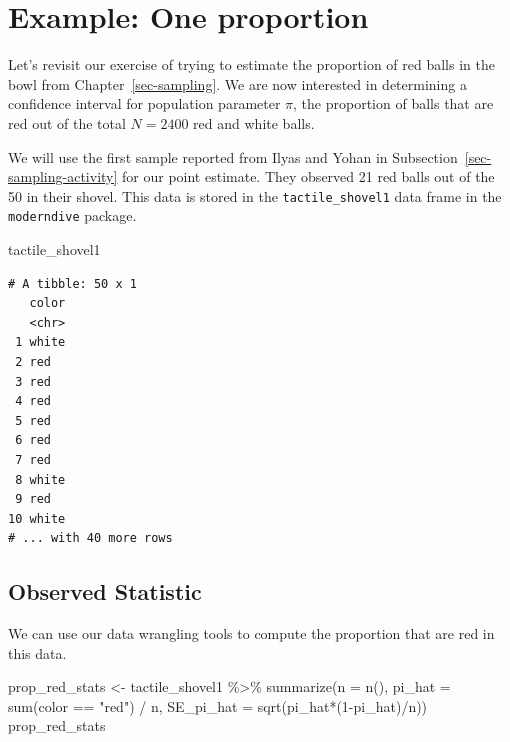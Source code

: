 \documentclass[
  letterpaper,
  DIV=11,
  numbers=noendperiod]{scrreprt}
\newenvironment{Shaded}{\begin{snugshade}}{\end{snugshade}}
\newcommand{\AttributeTok}[1]{\textcolor[rgb]{0.40,0.45,0.13}{#1}}
\newcommand{\DecValTok}[1]{\textcolor[rgb]{0.68,0.00,0.00}{#1}}
\newcommand{\FunctionTok}[1]{\textcolor[rgb]{0.28,0.35,0.67}{#1}}
\newcommand{\NormalTok}[1]{\textcolor[rgb]{0.00,0.23,0.31}{#1}}
\newcommand{\OtherTok}[1]{\textcolor[rgb]{0.00,0.23,0.31}{#1}}
\newcommand{\SpecialCharTok}[1]{\textcolor[rgb]{0.37,0.37,0.37}{#1}}
\newcommand{\StringTok}[1]{\textcolor[rgb]{0.13,0.47,0.30}{#1}}
\theoremstyle{definition}
\theoremstyle{remark}
\begin{document}
\hypertarget{sec-one-prop-ci}{%
\section{Example: One proportion}\label{sec-one-prop-ci}}

Let's revisit our exercise of trying to estimate the proportion of red
balls in the bowl from Chapter~\ref{sec-sampling}. We are now interested
in determining a confidence interval for population parameter \(\pi\),
the proportion of balls that are red out of the total \(N = 2400\) red
and white balls.

We will use the first sample reported from Ilyas and Yohan in
Subsection~\ref{sec-sampling-activity} for our point estimate. They
observed 21 red balls out of the 50 in their shovel. This data is stored
in the \texttt{tactile\_shovel1} data frame in the \texttt{moderndive}
package.

\begin{Shaded}
\begin{Highlighting}[]
\NormalTok{tactile\_shovel1}
\end{Highlighting}
\end{Shaded}

\begin{verbatim}
# A tibble: 50 x 1
   color
   <chr>
 1 white
 2 red  
 3 red  
 4 red  
 5 red  
 6 red  
 7 red  
 8 white
 9 red  
10 white
# ... with 40 more rows
\end{verbatim}

\hypertarget{observed-statistic}{%
\subsection{Observed Statistic}\label{observed-statistic}}

We can use our data wrangling tools to compute the proportion that are
red in this data.

\begin{Shaded}
\begin{Highlighting}[]
\NormalTok{prop\_red\_stats }\OtherTok{\textless{}{-}}\NormalTok{ tactile\_shovel1 }\SpecialCharTok{\%\textgreater{}\%} 
  \FunctionTok{summarize}\NormalTok{(}\AttributeTok{n =} \FunctionTok{n}\NormalTok{(),}
            \AttributeTok{pi\_hat =} \FunctionTok{sum}\NormalTok{(color }\SpecialCharTok{==} \StringTok{"red"}\NormalTok{) }\SpecialCharTok{/}\NormalTok{ n,}
            \AttributeTok{SE\_pi\_hat =} \FunctionTok{sqrt}\NormalTok{(pi\_hat}\SpecialCharTok{*}\NormalTok{(}\DecValTok{1}\SpecialCharTok{{-}}\NormalTok{pi\_hat)}\SpecialCharTok{/}\NormalTok{n))}
\NormalTok{prop\_red\_stats}
\end{Highlighting}
\end{Shaded}
\end{document}
